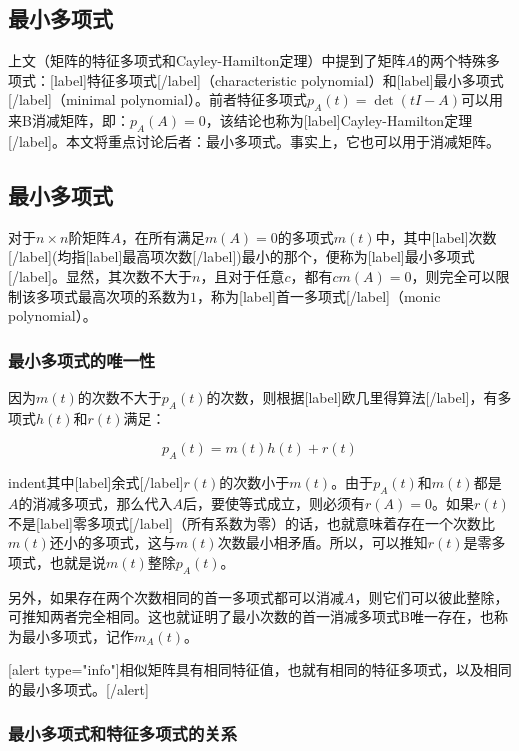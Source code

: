 \documentclass[UTF8,nofonts]{ctexart}
\begin{document}

\subsection*{最小多项式}

上文（矩阵的特征多项式和Cayley-Hamilton定理）中提到了矩阵$A$的两个特殊多项式：[label]特征多项式[/label]（characteristic polynomial）和[label]最小多项式[/label]（minimal polynomial）。前者特征多项式$p_A(t)=\det(tI-A)$可以用来B消减矩阵，即：$p_A(A)=0$，该结论也称为[label]Cayley-Hamilton定理[/label]。本文将重点讨论后者：最小多项式。事实上，它也可以用于消减矩阵。

\subsection*{最小多项式}

对于$n \times n$阶矩阵$A$，在所有满足$m(A)=0$的多项式$m(t)$中，其中[label]次数[/label](均指[label]最高项次数[/label])最小的那个，便称为[label]最小多项式[/label]。显然，其次数不大于$n$，且对于任意$c$，都有$cm(A)=0$，则完全可以限制该多项式最高次项的系数为$1$，称为[label]首一多项式[/label]（monic polynomial）。

\subsubsection*{最小多项式的唯一性}

因为$m(t)$的次数不大于$p_A(t)$的次数，则根据[label]欧几里得算法[/label]，有多项式$h(t)$和$r(t)$满足：

\begin{equation}
\label{eq:ecld}
p_A(t)=m(t)h(t)+r(t)
\end{equation}

indent其中[label]余式[/label]$r(t)$的次数小于$m(t)$。由于$p_A(t)$和$m(t)$都是$A$的消减多项式，那么代入$A$后，要使等式成立，则必须有$r(A)=0$。如果$r(t)$不是[label]零多项式[/label]（所有系数为零）的话，也就意味着存在一个次数比$m(t)$还小的多项式，这与$m(t)$次数最小相矛盾。所以，可以推知$r(t)$是零多项式，也就是说$m(t)$整除$p_A(t)$。

另外，如果存在两个次数相同的首一多项式都可以消减$A$，则它们可以彼此整除，可推知两者完全相同。这也就证明了最小次数的首一消减多项式B唯一存在，也称为最小多项式，记作$m_A(t)$。

[alert type="info"]相似矩阵具有相同特征值，也就有相同的特征多项式，以及相同的最小多项式。[/alert]

\subsubsection*{最小多项式和特征多项式的关系}
\end{document}
